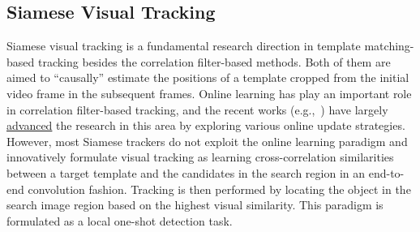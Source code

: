 \documentclass[journal]{IEEEtran}
\newcommand{\eg}{e.g.}
\begin{document}
\subsection{Siamese Visual Tracking}

Siamese visual tracking is a fundamental research direction in template matching-based tracking besides the correlation filter-based methods. Both of them are aimed to ``causally'' estimate the positions of a template cropped from the initial video frame in the subsequent frames. Online learning has play an important role in correlation filter-based tracking, and the recent works (\eg,~\cite{AutoTrack, 9376997, 9132673}) have largely \uline{advanced} the research in this area by exploring various online update strategies. However, most Siamese trackers do not exploit the online learning paradigm and innovatively formulate visual tracking as learning cross-correlation similarities between a target template and the candidates in the search region in an end-to-end convolution fashion. Tracking is then performed by locating the object in the search image region based on the highest visual similarity. This paradigm is formulated as a local one-shot detection task.
\end{document}
